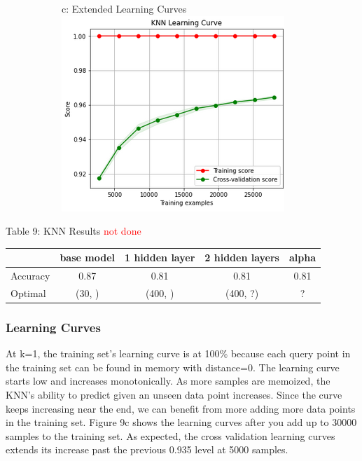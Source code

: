 \documentclass{article}
\newcommand\todo[1]{\textcolor{red}{#1}}
\begin{document}
\begin{figure}
\begin{subfigure}{.34\textwidth}
	\end{subfigure}
		\begin{subfigure}{.34\textwidth}
		\centering
		c: Extended Learning Curves\\
		\includegraphics[width=\linewidth]{mnist_knn_learning2.png}
		
	\end{subfigure}
	\label{fig:test}
\end{figure}

\begin{table}
	
	\centering
	Table 9: KNN Results \todo{not done}\\
	\begin{tabular}{ l c c c c }
		\hline
		& base model & 1 hidden layer & 2 hidden layers & alpha \\
		\hline
		Accuracy & 0.87 & 0.81 & 0.81 & 0.81 \\
		Optimal & (30, ) & (400, ) & (400, ?) & ? \\
		
		
		\hline 
	\end{tabular}
\end{table}
\subsubsection*{Learning Curves}

At k=1, the training set's learning curve is at 100\% because each query point in the training set can be found in memory with distance=0. The learning curve starts low and increases monotonically. As more samples are memoized, the KNN's ability to predict given an unseen data point increases. Since the curve keeps increasing near the end, we can benefit from more adding more data points in the training set. Figure 9c shows the learning curves after you add up to 30000 samples to the training set. As expected, the cross validation learning curves extends its increase past the previous 0.935 level at 5000 samples.
\end{document}
